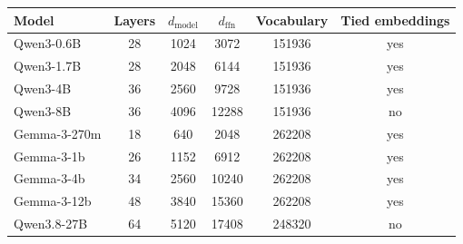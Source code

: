 \begin{tabular}{lccccc}
\toprule
Model & Layers & $d_\text{model}$ & $d_\text{ffn}$ & Vocabulary & Tied embeddings \\
\midrule
Qwen3-0.6B & 28 & 1024 & 3072 & 151936 & yes \\
Qwen3-1.7B & 28 & 2048 & 6144 & 151936 & yes \\
Qwen3-4B & 36 & 2560 & 9728 & 151936 & yes \\
Qwen3-8B & 36 & 4096 & 12288 & 151936 & no \\
\midrule
Gemma-3-270m & 18 & 640 & 2048 & 262208 & yes \\
Gemma-3-1b & 26 & 1152 & 6912 & 262208 & yes \\
Gemma-3-4b & 34 & 2560 & 10240 & 262208 & yes \\
Gemma-3-12b & 48 & 3840 & 15360 & 262208 & yes \\
\midrule
Qwen3.8-27B & 64 & 5120 & 17408 & 248320 & no \\
\bottomrule
\end{tabular}
